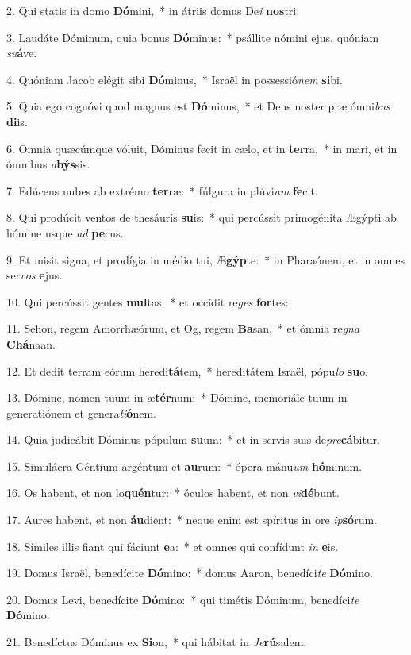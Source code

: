 2. Qui statis in domo \textbf{Dó}mini,~*  in átriis domus De\textit{i} \textbf{nos}tri.\

3. Laudáte Dóminum, quia bonus \textbf{Dó}minus:~*  psállite nómini ejus, quóniam \textit{su}\textbf{á}ve.\

4. Quóniam Jacob elégit sibi \textbf{Dó}minus,~*  Israël in possessió\textit{nem} \textbf{si}bi.\

5. Quia ego cognóvi quod magnus est \textbf{Dó}minus,~*  et Deus noster præ ómni\textit{bus} \textbf{di}is.\

6. Omnia quæcúmque vóluit, Dóminus fecit in cælo, et in \textbf{ter}ra,~*  in mari, et in ómnibus \textit{a}\textbf{býs}sis.\

7. Edúcens nubes ab extrémo \textbf{ter}ræ:~*  fúlgura in plúvi\textit{am} \textbf{fe}cit.\

8. Qui prodúcit ventos de thesáuris \textbf{su}is:~*  qui percússit primogénita Ægýpti ab hómine usque \textit{ad} \textbf{pe}cus.\

9. Et misit signa, et prodígia in médio tui, Æ\textbf{gýp}te:~*  in Pharaónem, et in omnes ser\textit{vos} \textbf{e}jus.\

10. Qui percússit gentes \textbf{mul}tas:~*  et occídit re\textit{ges} \textbf{for}tes:\

11. Sehon, regem Amorrhæórum, et Og, regem \textbf{Ba}san,~*  et ómnia re\textit{gna} \textbf{Chá}naan.\

12. Et dedit terram eórum heredi\textbf{tá}tem,~*  hereditátem Israël, pópu\textit{lo} \textbf{su}o.\

13. Dómine, nomen tuum in æ\textbf{tér}num:~*  Dómine, memoriále tuum in generatiónem et genera\textit{ti}\textbf{ó}nem.\

14. Quia judicábit Dóminus pópulum \textbf{su}um:~*  et in servis suis de\textit{pre}\textbf{cá}bitur.\

15. Simulácra Géntium argéntum et \textbf{au}rum:~*  ópera mánu\textit{um} \textbf{hó}minum.\

16. Os habent, et non lo\textbf{quén}tur:~*  óculos habent, et non \textit{vi}\textbf{dé}bunt.\

17. Aures habent, et non \textbf{áu}dient:~*  neque enim est spíritus in ore \textit{ip}\textbf{só}rum.\

18. Símiles illis fiant qui fáciunt \textbf{e}a:~*  et omnes qui confídunt \textit{in} \textbf{e}is.\

19. Domus Israël, benedícite \textbf{Dó}mino:~*  domus Aaron, benedíci\textit{te} \textbf{Dó}mino.\

20. Domus Levi, benedícite \textbf{Dó}mino:~*  qui timétis Dóminum, benedíci\textit{te} \textbf{Dó}mino.\

21. Benedíctus Dóminus ex \textbf{Si}on,~*  qui hábitat in \textit{Je}\textbf{rú}salem.\

